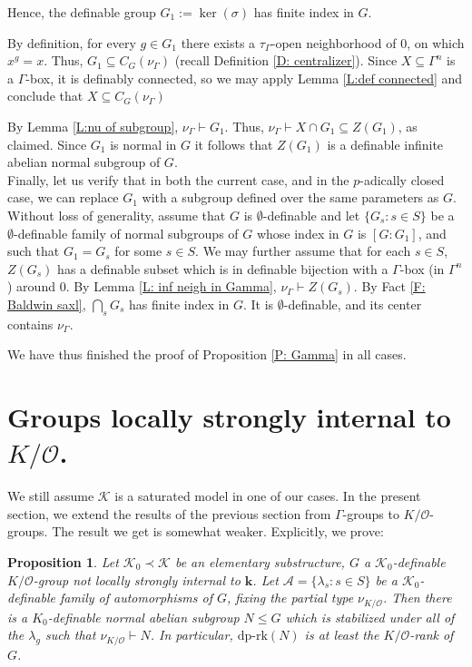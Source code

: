 \documentclass[11pt]{amsart}
\newtheorem{proposition}[theorem]{Proposition}
\theoremstyle{definition}
\newcommand{\CA}{\mathcal A}
\newcommand{\bk}{\textbf{k}}
\newcommand{\CK}{{\mathcal K}}
\newcommand{\CO}{{\mathcal O}}
\newcommand{\0}{\emptyset}
\def\dpr{\mathrm{dp\text{-}rk}}
\def\sub{\subseteq}
\begin{document}
Hence, the  definable group $G_1:=\ker(\sigma)$ has finite index in $G$. 


  By definition, for every $g\in G_1$ there exists a $\tau_\Gamma$-open neighborhood of $0$, on which $x^g=x$.
Thus, $G_1\sub C_G(\nu_\Gamma)$ (recall Definition \ref{D: centralizer}).  Since $X\sub \Gamma^n$ is a $\Gamma$-box, it is definably connected, so we may apply Lemma \ref{L:def connected} and conclude that $X\sub C_G(\nu_\Gamma)$
  

By Lemma \ref{L:nu of subgroup}, $\nu_\Gamma\vdash G_1$. Thus, $\nu_\Gamma\vdash X\cap G_1\sub Z(G_1)$, as claimed.
 Since $G_1$ is normal in $G$ it follows that $Z(G_1)$ is a definable infinite abelian normal subgroup of $G$. \\
 

Finally, let us verify that in both the current case, and in the $p$-adically closed case, we can replace $G_1$ with a subgroup defined over the same parameters as $G$. Without loss of generality, assume that $G$ is $\0$-definable and let $\{G_s:s\in S\}$ be a $\0$-definable family of normal subgroups of $G$ whose index in $G$ is $[G:G_1]$, and such that $G_1=G_s$ for some $s\in S$. We may further assume that for each $s\in S$, $Z(G_s)$ has a definable subset which is in definable bijection with a $\Gamma$-box (in $\Gamma^n$) around $0$. By Lemma \ref{L: inf neigh in Gamma}, $\nu_\Gamma \vdash Z(G_s)$. 
By Fact \ref{F: Baldwin saxl}, $\bigcap_s G_s$ has finite index in $G$. It is $\0$-definable, and its center contains $\nu_\Gamma$. 

We have thus finished the proof of Proposition \ref{P: Gamma} in all cases. 
\label{section: Gamma}

\section{Groups locally strongly internal to $K/\CO$.}
We still assume $\CK$ is a saturated model in one of our cases. 
In the present section, we extend the results of the previous section from $\Gamma$-groups to $K/\CO$-groups. The result we get is somewhat weaker. Explicitly, we prove: 


\begin{proposition}\label{P: K/O}
  Let $\CK_0\prec \CK$ be an elementary substructure, $G$ a $\CK_0$-definable  $K/\CO$-group not locally strongly internal to $\bk$. Let $\CA=\{\lambda_s:s\in S\}$ be a $\CK_0$-definable family of automorphisms of $G$, fixing the partial type $\nu_{K/\CO}$. Then there is a $K_0$-definable normal abelian subgroup $N\leq G$ which is stabilized under all of the $\lambda_g$ such that $\nu_{K/\CO}\vdash N$. In particular, $\dpr(N)$ is at least the $K/\CO$-rank of $G$. 
\end{proposition}
\end{document}

